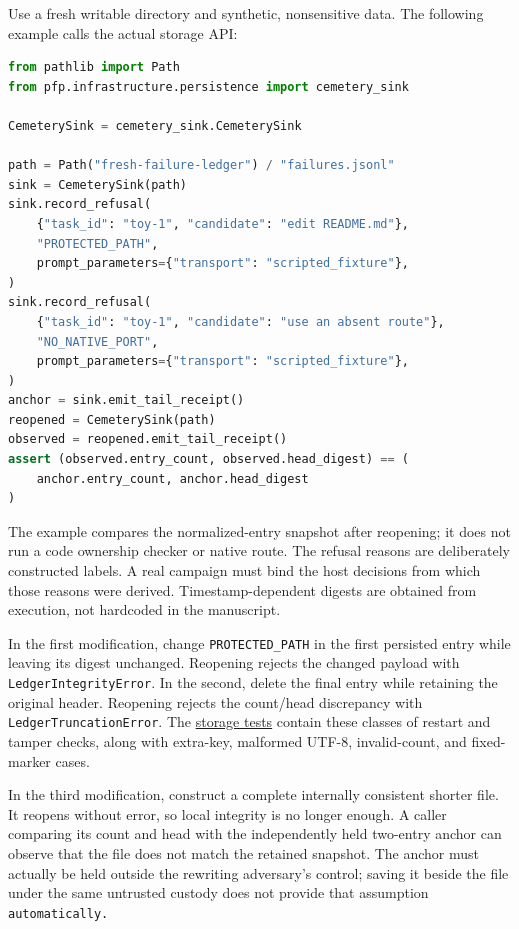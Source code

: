 \documentclass[
  11pt,
]{article}
\begin{document}
Use a fresh writable directory and synthetic, nonsensitive data. The
following example calls the actual storage API:

\begin{lstlisting}[language=Python]
from pathlib import Path
from pfp.infrastructure.persistence import cemetery_sink

CemeterySink = cemetery_sink.CemeterySink

path = Path("fresh-failure-ledger") / "failures.jsonl"
sink = CemeterySink(path)
sink.record_refusal(
    {"task_id": "toy-1", "candidate": "edit README.md"},
    "PROTECTED_PATH",
    prompt_parameters={"transport": "scripted_fixture"},
)
sink.record_refusal(
    {"task_id": "toy-1", "candidate": "use an absent route"},
    "NO_NATIVE_PORT",
    prompt_parameters={"transport": "scripted_fixture"},
)
anchor = sink.emit_tail_receipt()
reopened = CemeterySink(path)
observed = reopened.emit_tail_receipt()
assert (observed.entry_count, observed.head_digest) == (
    anchor.entry_count, anchor.head_digest
)
\end{lstlisting}

The example compares the normalized-entry snapshot after reopening; it
does not run a code ownership checker or native route. The refusal
reasons are deliberately constructed labels. A real campaign must bind
the host decisions from which those reasons were derived.
Timestamp-dependent digests are obtained from execution, not hardcoded
in the manuscript.

In the first modification, change \nolinkurl{PROTECTED_PATH} in the
first persisted entry while leaving its digest unchanged. Reopening
rejects the changed payload with \nolinkurl{LedgerIntegrityError}. In
the second, delete the final entry while retaining the original header.
Reopening rejects the count/head discrepancy with
\nolinkurl{LedgerTruncationError}. The
\href{https://github.com/dbccpage/the_symbol_game/blob/52cb5457f6c485ba548cfd292f6012a941ed22cf/pfp/tests/test_cemetery_sink.py}{storage
tests} contain these classes of restart and tamper checks, along with
extra-key, malformed UTF-8, invalid-count, and fixed-marker cases.

In the third modification, construct a complete internally consistent
shorter file. It reopens without error, so local integrity is no longer
enough. A caller comparing its count and head with the independently
held two-entry anchor can observe that the file does not match the
retained snapshot. The anchor must actually be held outside the
rewriting adversary's control; saving it beside the file under the same
untrusted custody does not provide that assumption
\nolinkurl{automatically.}
\end{document}
